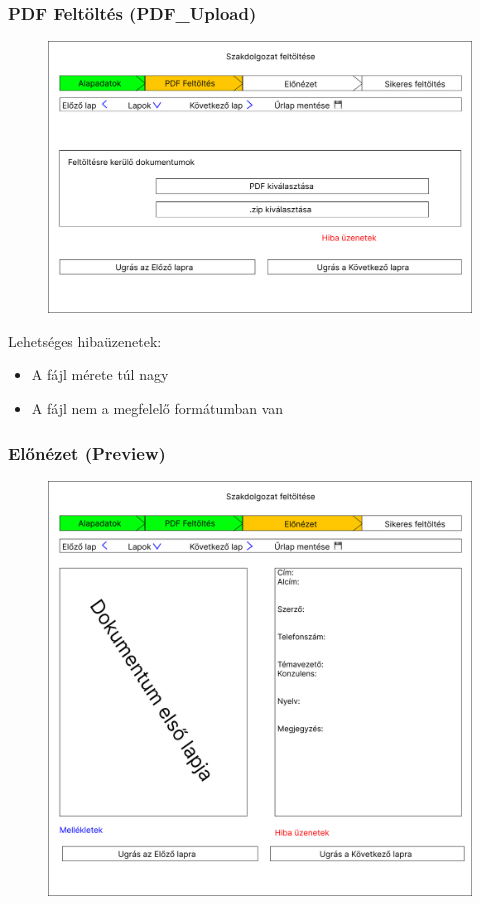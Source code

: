 \documentclass[a4paper,12pt]{article}
\begin{document}
\subsubsection{PDF Feltöltés (PDF\_Upload)}

\begin{figure}
	\centering
	\includegraphics[width=\textwidth]{images/Web_pages/PDF_Upload.jpg}
	\caption{}
	\label{fig:PDF_Upload}
\end{figure}

Lehetséges hibaüzenetek:
\begin{itemize}
	\item A fájl mérete túl nagy
	\item A fájl nem a megfelelő formátumban van
\end{itemize}

\subsubsection{Előnézet (Preview)}

\begin{figure}
	\centering
	\includegraphics[width=\textwidth]{images/Web_pages/Preview.jpg}
	\caption{}
	\label{fig:Preview}
\end{figure}
\end{document}
